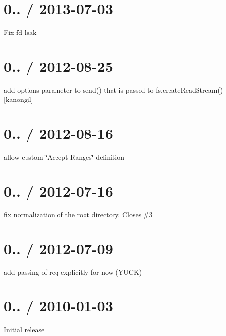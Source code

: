 \section*{0.. / 2013-\/07-\/03 }


\begin{DoxyItemize}
\item Fix fd leak
\end{DoxyItemize}

\section*{0.. / 2012-\/08-\/25 }


\begin{DoxyItemize}
\item add options parameter to send() that is passed to fs.\+create\+Read\+Stream() \mbox{[}kanongil\mbox{]}
\end{DoxyItemize}

\section*{0.. / 2012-\/08-\/16 }


\begin{DoxyItemize}
\item allow custom \char`\"{}\+Accept-\/\+Ranges\char`\"{} definition
\end{DoxyItemize}

\section*{0.. / 2012-\/07-\/16 }


\begin{DoxyItemize}
\item fix normalization of the root directory. Closes \#3
\end{DoxyItemize}

\section*{0.. / 2012-\/07-\/09 }


\begin{DoxyItemize}
\item add passing of req explicitly for now (Y\+U\+CK)
\end{DoxyItemize}

\section*{0.. / 2010-\/01-\/03 }


\begin{DoxyItemize}
\item Initial release 
\end{DoxyItemize}
